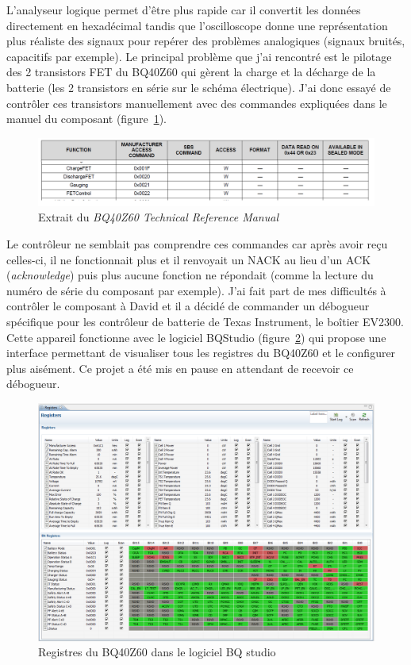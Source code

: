 \documentclass[a4paper, 12pt, sffamily]{report}
\begin{document}
L’analyseur logique permet d’être plus rapide car il convertit les données directement en hexadécimal tandis que l’oscilloscope donne une représentation plus réaliste des signaux pour repérer des problèmes analogiques (signaux bruités, capacitifs par exemple).
Le principal problème que j’ai rencontré est le pilotage des 2 transistors FET du BQ40Z60 qui gèrent la charge et la décharge de la batterie (les 2 transistors en série sur le schéma électrique).
J’ai donc essayé de contrôler ces transistors manuellement avec des commandes expliquées dans le manuel du composant (figure~\ref{fig:BQ40Z60_manual_excerpt}).

\begin{figure}[H]
\centering
\includegraphics[scale=0.82]{figures/screenshots/BQ40Z60_manual_excerpt.png}
\caption{Extrait du \emph{BQ40Z60 Technical Reference Manual}\cite{BQ40Z60_tech_manual}} 
\label{fig:BQ40Z60_manual_excerpt}
\end{figure}

Le contrôleur ne semblait pas comprendre ces commandes car après avoir reçu celles-ci, il ne fonctionnait plus et il renvoyait un NACK au lieu d’un ACK (\emph{acknowledge}) puis plus aucune fonction ne répondait (comme la lecture du numéro de série du composant par exemple).
J’ai fait part de mes difficultés à contrôler le composant à David et il a décidé de commander un débogueur spécifique pour les contrôleur de batterie de Texas Instrument, le boîtier EV2300. Cette appareil fonctionne avec le logiciel BQStudio (figure~\ref{fig:BQ40Z60_registers}) qui propose une interface permettant de visualiser tous les registres du BQ40Z60 et le configurer plus aisément. Ce projet a été mis en pause en attendant de recevoir ce débogueur.

\begin{figure}[H]
\centering
\includegraphics[scale=0.4]{figures/screenshots/BQ40Z60_registers.png}
\caption{Registres du BQ40Z60 dans le logiciel BQ studio}
\label{fig:BQ40Z60_registers}
\end{figure}
\end{document}
